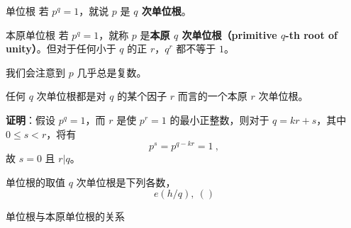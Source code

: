 

\begin{definition}{单位根}
若 $p^q=1$，就说 $p$ 是 \textbf{$q$ 次单位根}。
\end{definition}

\begin{definition}{本原单位根}
若 $p^q = 1$，就称 $p$ 是\textbf{本原 $q$ 次单位根（primitive $q$-th root of unity）}。但对于任何小于 $q$ 的正 $r$，$q^r$ 都不等于 $1$。
\end{definition}
我们会注意到 $p$ 几乎总是复数。

\begin{theorem}{}
任何 $q$ 次单位根都是对 $q$ 的某个因子 $r$ 而言的一个本原 $r$ 次单位根。
\end{theorem}
\textbf{证明}：假设 $p^q=1$，而 $r$ 是使 $p^r=1$ 的最小正整数，则对于 $q = kr+s$，其中 $0\le s < r$，将有
\begin{equation}
p^s = p^{q - kr} = 1~,
\end{equation}
故 $s=0$ 且 $r | q$。

\begin{theorem}{单位根的取值}
$q$ 次单位根是下列各数，
\begin{equation}
e\left( h/q \right), ~ ()
\end{equation}

\end{theorem}

\begin{theorem}{单位根与本原单位根的关系}

\end{theorem}